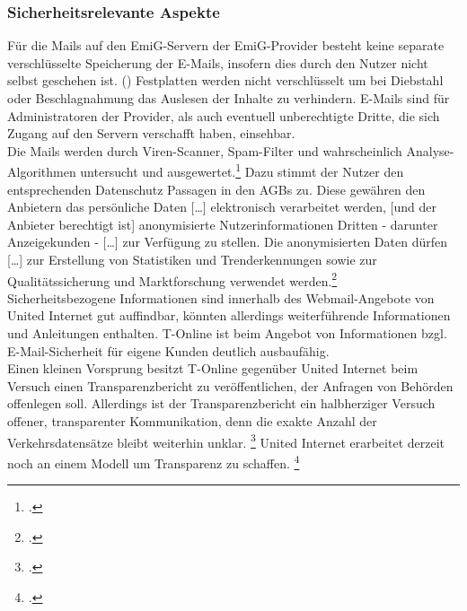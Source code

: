 \documentclass  [paper=a4,
				fontsize=12pt,
				listof=totoc,
				bibliography=totoc
				]{scrreprt}
\begin{document}
		\subsubsection{Sicherheitsrelevante Aspekte}
			Für die Mails auf den \ac{EmiG}-Servern der \ac{EmiG}-Provider besteht keine separate verschlüsselte Speicherung der E-Mails, insofern dies durch den Nutzer nicht selbst geschehen ist. ()
			Festplatten werden nicht verschlüsselt um bei Diebstahl oder Beschlagnahmung das Auslesen der Inhalte zu verhindern.
			E-Mails sind für Administratoren der Provider, als auch eventuell unberechtigte Dritte, die sich Zugang auf den Servern verschafft haben, einsehbar.\\
			Die Mails werden durch Viren-Scanner, Spam-Filter und wahrscheinlich Analyse-Algorithmen untersucht und ausgewertet.\footcite[Vgl.][]{Kurz13}
			Dazu stimmt der Nutzer den entsprechenden Datenschutz Passagen in den AGBs zu. Diese gewähren den Anbietern das \glqq [\dots] persönliche Daten [\dots] elektronisch verarbeitet werden, [und der Anbieter berechtigt ist] anonymisierte Nutzerinformationen Dritten - darunter Anzeigekunden - [\dots] zur Verfügung zu stellen. Die anonymisierten Daten dürfen [\dots] zur Erstellung von Statistiken und Trenderkennungen sowie zur Qualitätssicherung und Marktforschung verwendet werden.\grqq \footcite[][]{Web2012}\\
			Sicherheitsbezogene Informationen sind innerhalb des Webmail-Angebote von United Internet gut auffindbar, könnten allerdings weiterführende Informationen und Anleitungen enthalten.
			T-Online ist beim Angebot von Informationen bzgl. E-Mail-Sicherheit für eigene Kunden deutlich ausbaufähig.\\
			Einen kleinen Vorsprung besitzt T-Online gegenüber United Internet beim Versuch einen Transparenzbericht zu veröffentlichen, der Anfragen von Behörden offenlegen soll.
			Allerdings ist der Transparenzbericht ein halbherziger Versuch offener, transparenter Kommunikation, denn die exakte Anzahl der Verkehrsdatensätze bleibt weiterhin unklar.
			\footcite[Vgl.][]{Beuth14}
			United Internet erarbeitet derzeit noch an einem Modell um Transparenz zu schaffen.
			\footcite[Vgl.][]{Boehm14}
\end{document}

